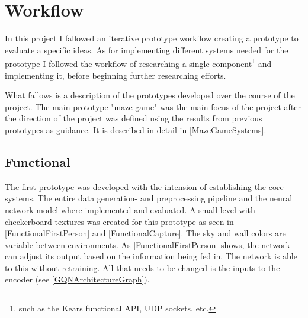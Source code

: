 
\chapter{Workflow}
In this project I fallowed an iterative prototype workflow creating a prototype to evaluate a specific ideas. As for implementing different systems needed for the prototype I followed the workflow of researching a single component\footnote{such as the Kears functional API, UDP sockets, etc.} and implementing it, before beginning further researching efforts.

What fallows is a description of the prototypes developed over the course of the project. The main prototype "maze game" was the main focus of the project after the direction of the project was defined using the results from previous prototypes as guidance. It is described in detail in \cref{MazeGameSystems}.


\section{Functional}
The first prototype was developed with the intension of establishing the core systems. The entire data generation- and preprocessing pipeline and the neural network model where implemented and evaluated. A small level with checkerboard textures was created for this prototype as seen in \cref{FunctionalFirstPerson} and \cref{FunctionalCapture}. The sky and wall colors are variable between environments. As \cref{FunctionalFirstPerson} shows, the network can adjust its output based on the information being fed in. The network is able to this without retraining. All that needs to be changed is the inputs to the encoder (see \cref{GQNArchitectureGraph}). 

